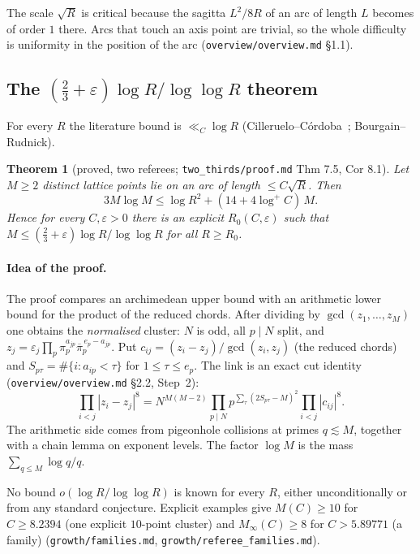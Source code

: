 \documentclass[11pt]{article}
\newtheorem{theorem}{Theorem}[section]
\newcommand{\conj}[1]{\overline{#1}}
\newcommand{\rec}[1]{\texttt{#1}}
\begin{document}
The scale \(\sqrt R\) is critical because the sagitta \(L^2/8R\) of an arc of
length \(L\) becomes of order \(1\) there.  Arcs that touch an axis point are
trivial, so the whole difficulty is uniformity in the position of the arc
(\rec{overview/overview.md} \S1.1).

\subsection{The \texorpdfstring{\((\frac23+\varepsilon)\log R/\log\log R\)}{(2/3+eps) log R/loglog R} theorem}

For every \(R\) the literature bound is \(\ll_C\log R\)
(Cilleruelo--C\'ordoba~\cite{CillerueloCordoba1992}; Bourgain--Rudnick).

\begin{theorem}[proved, two referees; \rec{two\_thirds/proof.md} Thm 7.5, Cor 8.1]\label{thm:twothirds}
Let \(M\ge2\) distinct lattice points lie on an arc of length \(\le C\sqrt R\).
Then
\[
  3M\log M\le\log R^2+(14+4\log^+C)\,M .
\]
Hence for every \(C,\varepsilon>0\) there is an explicit \(R_0(C,\varepsilon)\)
such that \(M\le(\frac23+\varepsilon)\log R/\log\log R\) for all \(R\ge R_0\).
\end{theorem}

\paragraph{Idea of the proof.}
The proof compares an archimedean upper bound with an arithmetic lower bound
for the product of the reduced chords.  After dividing by
\(\gcd(z_1,\dots,z_M)\) one obtains the \emph{normalised} cluster: \(N\) is
odd, all \(p\mid N\) split, and
\(z_j=\varepsilon_j\prod_p\pi_p^{a_{jp}}\conj\pi_p^{\,e_p-a_{jp}}\).  Put
\(c_{ij}=(z_i-z_j)/\gcd(z_i,z_j)\) (the reduced chords) and
\(S_{p\tau}=\#\{i:a_{ip}<\tau\}\) for \(1\le\tau\le e_p\).  The link is an exact
cut identity (\rec{overview/overview.md} \S2.2, Step~2):
\[
  \prod_{i<j}|z_i-z_j|^8
  =N^{M(M-2)}\prod_{p\mid N}p^{\sum_\tau(2S_{p\tau}-M)^2}\prod_{i<j}|c_{ij}|^8 .
\]
The arithmetic side comes from pigeonhole collisions at primes
\(q\lesssim M\), together with a chain lemma on exponent levels.  The factor
\(\log M\) is the mass \(\sum_{q\le M}\log q/q\).

No bound \(o(\log R/\log\log R)\) is known for every \(R\), either
unconditionally or from any standard conjecture.  Explicit examples give
\(M(C)\ge10\) for \(C\ge8.2394\) (one explicit \(10\)-point cluster) and
\(M_\infty(C)\ge8\) for \(C>5.89771\) (a family)
(\rec{growth/families.md}, \rec{growth/referee\_families.md}).
\end{document}
